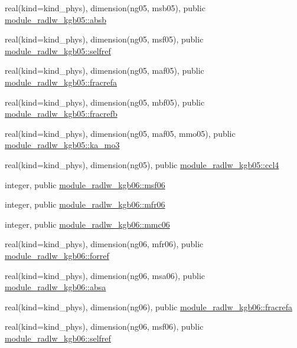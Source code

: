 \begin{DoxyCompactItemize}
real(kind=kind\+\_\+phys), dimension(ng05, msb05), public \hyperlink{group__module__radlw__main_gaebc667b0569824bba455e822eaea6112}{module\+\_\+radlw\+\_\+kgb05\+::absb}
\item 
real(kind=kind\+\_\+phys), dimension(ng05, msf05), public \hyperlink{group__module__radlw__main_ga3c727eabe159c88fca912f33a2b91943}{module\+\_\+radlw\+\_\+kgb05\+::selfref}
\item 
real(kind=kind\+\_\+phys), dimension(ng05, maf05), public \hyperlink{group__module__radlw__main_ga335fd60e59154f47724d2e25fdf0a5fb}{module\+\_\+radlw\+\_\+kgb05\+::fracrefa}
\item 
real(kind=kind\+\_\+phys), dimension(ng05, mbf05), public \hyperlink{group__module__radlw__main_gaf7b1fd9c6b966e03a226dd8cbc058670}{module\+\_\+radlw\+\_\+kgb05\+::fracrefb}
\item 
real(kind=kind\+\_\+phys), dimension(ng05, maf05, mmo05), public \hyperlink{group__module__radlw__main_ga6021fc2f60379615b7882a28e1caa1e9}{module\+\_\+radlw\+\_\+kgb05\+::ka\+\_\+mo3}
\item 
real(kind=kind\+\_\+phys), dimension(ng05), public \hyperlink{group__module__radlw__main_ga15c6b3bfa9d8cbf20099dd4f364444b5}{module\+\_\+radlw\+\_\+kgb05\+::ccl4}
\item 
integer, public \hyperlink{group__module__radlw__main_ga65f808aeb87457d383dd7f9366878fb9}{module\+\_\+radlw\+\_\+kgb06\+::msf06}
\item 
integer, public \hyperlink{group__module__radlw__main_gaaf1f13cdb5c2888b416a91e8b17e41d8}{module\+\_\+radlw\+\_\+kgb06\+::mfr06}
\item 
integer, public \hyperlink{group__module__radlw__main_gaf7a377cb66fd48348789c20f5a31dec6}{module\+\_\+radlw\+\_\+kgb06\+::mmc06}
\item 
real(kind=kind\+\_\+phys), dimension(ng06, mfr06), public \hyperlink{group__module__radlw__main_ga6a0467b666bc75f90ae58fa4f58f07f0}{module\+\_\+radlw\+\_\+kgb06\+::forref}
\item 
real(kind=kind\+\_\+phys), dimension(ng06, msa06), public \hyperlink{group__module__radlw__main_ga21bd40309855c89a64b88be171bfde59}{module\+\_\+radlw\+\_\+kgb06\+::absa}
\item 
real(kind=kind\+\_\+phys), dimension(ng06), public \hyperlink{group__module__radlw__main_ga1354ecbc5f07cd763847333e680c686a}{module\+\_\+radlw\+\_\+kgb06\+::fracrefa}
\item 
real(kind=kind\+\_\+phys), dimension(ng06, msf06), public \hyperlink{group__module__radlw__main_ga98901725947a4477924a47af5e67277e}{module\+\_\+radlw\+\_\+kgb06\+::selfref}

\end{DoxyCompactItemize}
